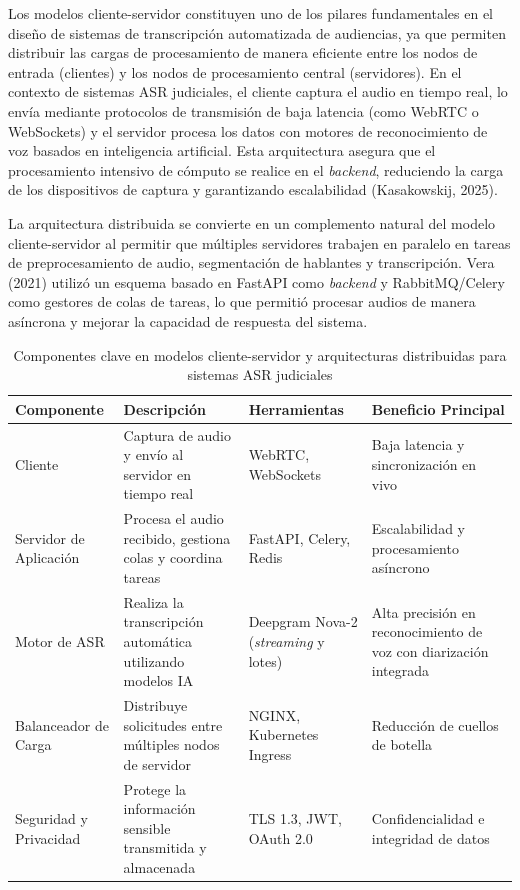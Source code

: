 \documentclass[12pt,a4paper,oneside]{report}
\begin{document}
Los modelos cliente-servidor constituyen uno de los pilares fundamentales en el diseño de sistemas de transcripción automatizada de audiencias, ya que permiten distribuir las cargas de procesamiento de manera eficiente entre los nodos de entrada (clientes) y los nodos de procesamiento central (servidores). En el contexto de sistemas ASR judiciales, el cliente captura el audio en tiempo real, lo envía mediante protocolos de transmisión de baja latencia (como WebRTC o WebSockets) y el servidor procesa los datos con motores de reconocimiento de voz basados en inteligencia artificial. Esta arquitectura asegura que el procesamiento intensivo de cómputo se realice en el \textit{backend}, reduciendo la carga de los dispositivos de captura y garantizando escalabilidad (Kasakowskij, 2025).

La arquitectura distribuida se convierte en un complemento natural del modelo cliente-servidor al permitir que múltiples servidores trabajen en paralelo en tareas de preprocesamiento de audio, segmentación de hablantes y transcripción. Vera (2021) utilizó un esquema basado en FastAPI como \textit{backend} y RabbitMQ/Celery como gestores de colas de tareas, lo que permitió procesar audios de manera asíncrona y mejorar la capacidad de respuesta del sistema.

\begin{table}[H]
\centering
\caption{Componentes clave en modelos cliente-servidor y arquitecturas distribuidas para sistemas ASR judiciales}
\begin{tabular}{|p{2.5cm}|p{3.5cm}|p{3cm}|p{3cm}|}
\hline
\rowcolor{gray!20}
\textbf{Componente} & \textbf{Descripción} & \textbf{Herramientas} & \textbf{Beneficio Principal} \\
\hline
Cliente & Captura de audio y envío al servidor en tiempo real & WebRTC, WebSockets & Baja latencia y sincronización en vivo \\
\hline
Servidor de Aplicación & Procesa el audio recibido, gestiona colas y coordina tareas & FastAPI, Celery, Redis & Escalabilidad y procesamiento asíncrono \\
\hline
Motor de ASR & Realiza la transcripción automática utilizando modelos IA & Deepgram Nova-2 (\textit{streaming} y lotes) & Alta precisión en reconocimiento de voz con diarización integrada \\
\hline
Balanceador de Carga & Distribuye solicitudes entre múltiples nodos de servidor & NGINX, Kubernetes Ingress & Reducción de cuellos de botella \\
\hline
Seguridad y Privacidad & Protege la información sensible transmitida y almacenada & TLS 1.3, JWT, OAuth 2.0 & Confidencialidad e integridad de datos \\
\hline
\end{tabular}
\label{tab:cliente_servidor}
\end{table}
\end{document}
